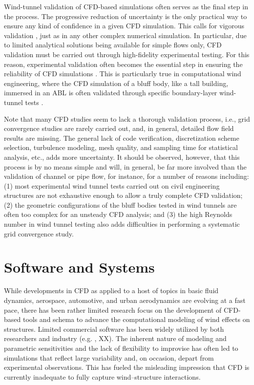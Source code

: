 Wind-tunnel validation of CFD-based simulations often serves as the final step in the process. The progressive reduction of uncertainty \citep{roache1998verification} is the only practical way to ensure any kind of confidence in a given CFD simulation. This calls for vigorous validation \citep{aiaa1998guide}, just as in any other complex numerical simulation. In particular, due to limited analytical solutions being available for simple flows only, CFD validation must be carried out through high-fidelity experimental testing. For this reason, experimental validation often becomes the essential step in ensuring the reliability of CFD simulations \citep{oberkampf2004verification, oberkampf2008verification,  roy2011comprehensive}. This is particularly true in computational wind engineering, where the CFD simulation of a bluff body, like a tall building, immersed in an ABL is often validated through specific boundary-layer wind-tunnel tests \citep{yu1998parametric, yu2013simulation}.

Note that many CFD studies seem to lack a thorough validation process, i.e., grid convergence studies are rarely carried out, and, in general, detailed flow field results are missing. The general lack of code verification, discretization scheme selection, turbulence modeling, mesh quality, and sampling time for statistical analysis, etc., adds more uncertainty. It should be observed, however, that this process is by no means simple and will, in general, be far more involved than the validation of channel or pipe flow, for instance, for a number of reasons including: (1) most experimental wind tunnel tests carried out on civil engineering structures are not exhaustive enough to allow a truly complete CFD validation; (2) the geometric configurations of the bluff bodies tested in wind tunnels are often too complex for an unsteady CFD analysis; and (3) the high Reynolds number in wind tunnel testing also adds difficulties in performing a systematic grid convergence study.

\section{Software and Systems}

While developments in CFD as applied to a host of topics in basic fluid dynamics, aerospace, automotive, and urban aerodynamics are evolving at a fast pace, there has been rather limited research focus on the development of CFD-based tools and schema to advance the computational modeling of wind effects on structures. Limited commercial software has been widely utilized by both researchers and industry (e.g. , XX). The inherent nature of modeling and parametric sensitivities and the lack of flexibility to improvise has often led to simulations that reflect large variability and, on occasion, depart from experimental observations. This has fueled the misleading impression that CFD is currently inadequate to fully capture wind--structure interactions. 

